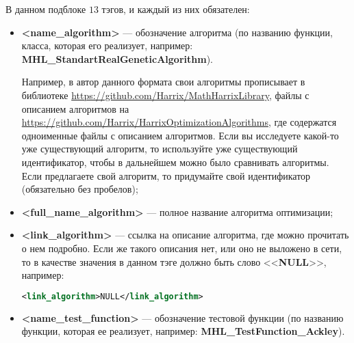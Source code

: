 \documentclass[a4paper,12pt]{article}
\begin{document}
В данном подблоке $ 13 $ тэгов, и каждый из них обязателен:
\begin{itemize}
\item \textbf{<name\_algorithm>} --- обозначение алгоритма (по названию функции, класса, которая его реализует, например: \textbf{MHL\_StandartRealGeneticAlgorithm}). 

Например, в автор данного формата свои алгоритмы прописывает в библиотеке \href {https://github.com/Harrix/MathHarrixLibrary} {https://github.com/Harrix/MathHarrixLibrary}, файлы с описанием алгоритмов на \href {https://github.com/Harrix/HarrixOptimizationAlgorithms} {https://github.com/Harrix/HarrixOptimizationAlgorithms}, где содержатся одноименные файлы с описанием алгоритмов. Если вы исследуете какой-то уже существующий алгоритм, то используйте уже существующий идентификатор, чтобы в дальнейшем можно было сравнивать алгоритмы. Если предлагаете свой алгоритм, то придумайте свой идентификатор (обязательно без пробелов);
\item \textbf{<full\_name\_algorithm>} --- полное название алгоритма оптимизации;
\item \textbf{<link\_algorithm>} --- ссылка на описание алгоритма, где можно прочитать о нем подробно. Если же такого описания нет, или оно не выложено в сети, то в качестве значения в данном тэге должно быть слово <<\textbf{NULL}>>, например:
\begin{lstlisting}[label=Part08, language=xml ,caption=У алгоритма нет ссылки в файле Harrix Optimization Testing]
<link_algorithm>NULL</link_algorithm>
\end{lstlisting}
\item \textbf{<name\_test\_function>} --- обозначение  тестовой функции (по названию функции, которая ее реализует, например: \textbf{MHL\_TestFunction\_Ackley}). 


\end{itemize}
\end{document}
